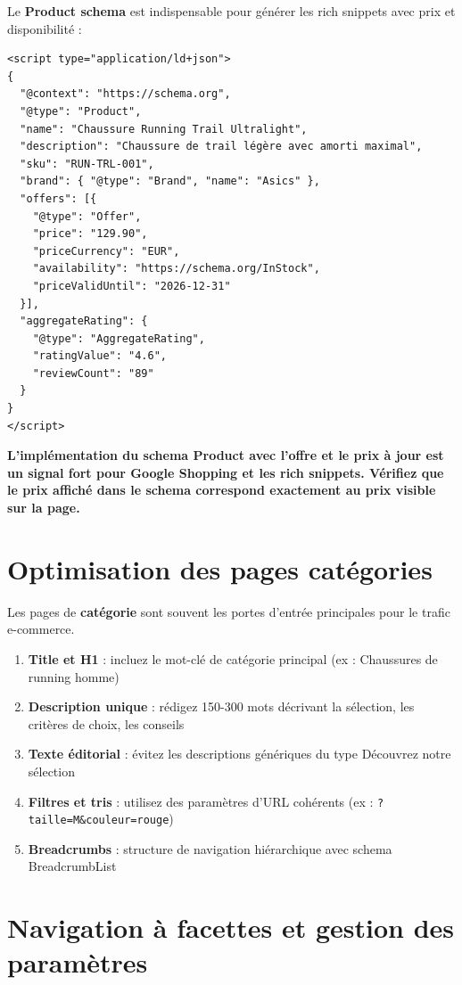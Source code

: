 \documentclass[12pt,a4paper,twoside]{report}
\newcommand{\keyword}[1]{\textbf{\textcolor{googleblue}{#1}}}
\newcommand{\important}[1]{\textbf{\textcolor{googlered}{#1}}}
\begin{document}
Le \keyword{Product schema} est indispensable pour générer les rich snippets avec prix et disponibilité :

\begin{lstlisting}[style=htmlcode,caption={Schema Product avec offre et avis}]
<script type="application/ld+json">
{
  "@context": "https://schema.org",
  "@type": "Product",
  "name": "Chaussure Running Trail Ultralight",
  "description": "Chaussure de trail légère avec amorti maximal",
  "sku": "RUN-TRL-001",
  "brand": { "@type": "Brand", "name": "Asics" },
  "offers": [{
    "@type": "Offer",
    "price": "129.90",
    "priceCurrency": "EUR",
    "availability": "https://schema.org/InStock",
    "priceValidUntil": "2026-12-31"
  }],
  "aggregateRating": {
    "@type": "AggregateRating",
    "ratingValue": "4.6",
    "reviewCount": "89"
  }
}
</script>
\end{lstlisting}

\important{L'implémentation du schema Product avec l'offre et le prix à jour est un signal fort pour Google Shopping et les rich snippets. Vérifiez que le prix affiché dans le schema correspond exactement au prix visible sur la page.}

\section{Optimisation des pages catégories}

Les pages de \keyword{catégorie} sont souvent les portes d'entrée principales pour le trafic e-commerce.

\begin{enumerate}
    \item \textbf{Title et H1} : incluez le mot-clé de catégorie principal (ex : \og Chaussures de running homme\fg)
    \item \textbf{Description unique} : rédigez 150-300 mots décrivant la sélection, les critères de choix, les conseils
    \item \textbf{Texte éditorial} : évitez les descriptions génériques du type \og Découvrez notre sélection\fg
    \item \textbf{Filtres et tris} : utilisez des paramètres d'URL cohérents (ex : \texttt{?taille=M\&couleur=rouge})
    \item \textbf{Breadcrumbs} : structure de navigation hiérarchique avec schema BreadcrumbList
\end{enumerate}

\section{Navigation à facettes et gestion des paramètres}
\end{document}
